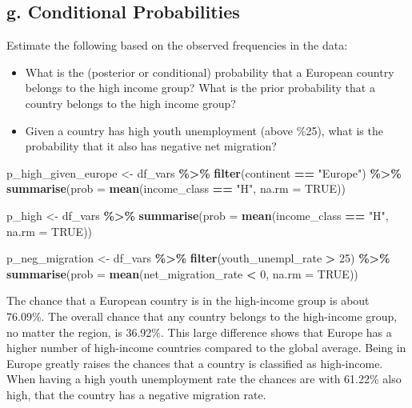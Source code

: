 \documentclass[
]{article}
\newenvironment{Shaded}{\begin{snugshade}}{\end{snugshade}}
\newcommand{\AttributeTok}[1]{\textcolor[rgb]{0.13,0.29,0.53}{#1}}
\newcommand{\ConstantTok}[1]{\textcolor[rgb]{0.56,0.35,0.01}{#1}}
\newcommand{\DecValTok}[1]{\textcolor[rgb]{0.00,0.00,0.81}{#1}}
\newcommand{\FunctionTok}[1]{\textcolor[rgb]{0.13,0.29,0.53}{\textbf{#1}}}
\newcommand{\NormalTok}[1]{#1}
\newcommand{\OtherTok}[1]{\textcolor[rgb]{0.56,0.35,0.01}{#1}}
\newcommand{\SpecialCharTok}[1]{\textcolor[rgb]{0.81,0.36,0.00}{\textbf{#1}}}
\newcommand{\StringTok}[1]{\textcolor[rgb]{0.31,0.60,0.02}{#1}}
\begin{document}
\subsection{g. Conditional
Probabilities}\label{g.-conditional-probabilities}

Estimate the following based on the observed frequencies in the data:

\begin{itemize}
\item
  What is the (posterior or conditional) probability that a European
  country belongs to the high income group? What is the prior
  probability that a country belongs to the high income group?
\item
  Given a country has high youth unemployment (above \%25), what is the
  probability that it also has negative net migration?
\end{itemize}

\begin{Shaded}
\begin{Highlighting}[]
\NormalTok{p\_high\_given\_europe }\OtherTok{\textless{}{-}}\NormalTok{ df\_vars }\SpecialCharTok{\%\textgreater{}\%}
  \FunctionTok{filter}\NormalTok{(continent }\SpecialCharTok{==} \StringTok{"Europe"}\NormalTok{) }\SpecialCharTok{\%\textgreater{}\%}
  \FunctionTok{summarise}\NormalTok{(}\AttributeTok{prob =} \FunctionTok{mean}\NormalTok{(income\_class }\SpecialCharTok{==} \StringTok{"H"}\NormalTok{, }\AttributeTok{na.rm =} \ConstantTok{TRUE}\NormalTok{))}

\NormalTok{p\_high }\OtherTok{\textless{}{-}}\NormalTok{ df\_vars }\SpecialCharTok{\%\textgreater{}\%}
  \FunctionTok{summarise}\NormalTok{(}\AttributeTok{prob =} \FunctionTok{mean}\NormalTok{(income\_class }\SpecialCharTok{==} \StringTok{"H"}\NormalTok{, }\AttributeTok{na.rm =} \ConstantTok{TRUE}\NormalTok{))}

\NormalTok{p\_neg\_migration }\OtherTok{\textless{}{-}}\NormalTok{ df\_vars }\SpecialCharTok{\%\textgreater{}\%}
  \FunctionTok{filter}\NormalTok{(youth\_unempl\_rate }\SpecialCharTok{\textgreater{}} \DecValTok{25}\NormalTok{) }\SpecialCharTok{\%\textgreater{}\%}
  \FunctionTok{summarise}\NormalTok{(}\AttributeTok{prob =} \FunctionTok{mean}\NormalTok{(net\_migration\_rate }\SpecialCharTok{\textless{}} \DecValTok{0}\NormalTok{, }\AttributeTok{na.rm =} \ConstantTok{TRUE}\NormalTok{))}
\end{Highlighting}
\end{Shaded}

The chance that a European country is in the high-income group is about
76.09\%. The overall chance that any country belongs to the high-income
group, no matter the region, is 36.92\%. This large difference shows
that Europe has a higher number of high-income countries compared to the
global average. Being in Europe greatly raises the chances that a
country is classified as high-income. When having a high youth
unemployment rate the chances are with 61.22\% also high, that the
country has a negative migration rate.
\end{document}
